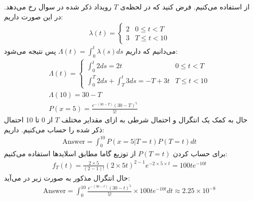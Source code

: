 از
استفاده می‌کنیم. فرض کنید که در لحظه‌ی
$T$
رویداد ذکر شده در سوال رخ می‌دهد. در این صورت داریم:
\begin{gather*}
    \lambda(t) = \begin{cases}
        2 & 0 \le t < T \\
        3 & T \le t < 10
    \end{cases}
\end{gather*}
می‌دانیم که داریم
$\Lambda(t) = \int_{0}^{t} \lambda(s) ds$
پس نتیجه می‌شود:
\begin{gather*}
    \Lambda(t) = \begin{cases}
        \int_{0}^{t} 2 ds = 2t & 0 \le t < T \\
        \int_{0}^{T} 2 ds + \int_{T}^{t} 3 ds = -T + 3 t & T \le t < 10
    \end{cases}\\
    \Lambda(10) = 30 - T\\
    P(x = 5) = \frac{e^{-(30 - T)} (30 - T)^5}{5!}
\end{gather*}
حال به کمک یک انتگرال و احتمال شرطی به ازای مقدایر مختلف
$T$
از 0 تا 10 احتمال ذکر شده را حساب می‌کنیم. داریم:
\begin{gather*}
    \text{Answer} = \int_{0}^{10} P(x = 5 | T = t) P(T = t) dt
\end{gather*}
برای حساب کردن
$P(T = t)$
از
توزیع گاما مطابق اسلاید‌ها استفاده می‌کنیم:
\begin{gather*}
    f_T(t) = \frac{2 \times 5}{(2 - 1)!} (2 \times 5 t)^{2 - 1} e^{-2 \times 5 \times t} = 100 t e^{-10t}
\end{gather*}
حال انتگرال مذکور به صورت زیر در می‌آید:
\begin{gather*}
    \text{Answer} = \int_{0}^{10} \frac{e^{-(30 - t)} (30 - t)^5}{5!} \times 100 t e^{-10t} dt \approx 2.25 \times 10^{-8}
\end{gather*}
\



